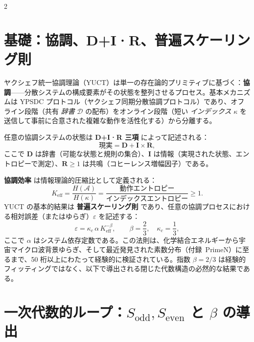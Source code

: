 \documentclass[12pt,a4paper]{article}
\newcommand{\Keff}{K_{\mathrm{eff}}}
\newcommand{\kappac}{\kappa_c}
\begin{document}
	\begin{multicols}{2}
		
		\section{基礎：協調、D+I·R、普遍スケーリング則}
		
		ヤクシェフ統一協調理論（YUCT）は単一の存在論的プリミティブに基づく：\textbf{協調}——分散システムの構成要素がその状態を整列させるプロセス。基本メカニズムは YPSDC プロトコル（ヤクシェフ同期分散協調プロトコル）であり、オフライン段階（共有 \textit{辞書} \(\mathcal{D}\) の配布）をオンライン段階（短い \textit{インデックス} \(\kappa\) を送信して事前に合意された複雑な動作を活性化する）から分離する。
		
		任意の協調システムの状態は \textbf{D+I·R 三項} によって記述される：
		\[
		\text{現実} = \mathbf{D} + \mathbf{I} \times \mathbf{R},
		\]
		ここで \(\mathbf{D}\) は辞書（可能な状態と規則の集合）、\(\mathbf{I}\) は情報（実現された状態、エントロピーで測定）、\(\mathbf{R} \ge 1\) は共鳴（コヒーレンス増幅因子）である。
		
		\textbf{協調効率} は情報理論的圧縮比として定義される：
		\[
		\Keff = \frac{H(\mathcal{A})}{H(\kappa)} = \frac{\text{動作エントロピー}}{\text{インデックスエントロピー}} \ge 1.
		\]
		YUCT の基本的結果は \textbf{普遍スケーリング則} であり、任意の協調プロセスにおける相対誤差（またはゆらぎ）\(\varepsilon\) を記述する：
		\[
		\boxed{\varepsilon = \kappac \, \alpha \, \Keff^{-\beta}, \qquad \beta = \frac{2}{3}, \quad \kappac = \frac{1}{3}},
		\]
		ここで \(\alpha\) はシステム依存定数である。この法則は、化学結合エネルギーから宇宙マイクロ波背景ゆらぎ、そして最近発見された素数分布（付録~PrimeN）に至るまで、50 桁以上にわたって経験的に検証されている。指数 \(\beta = 2/3\) は経験的フィッティングではなく、以下で導出される閉じた代数構造の必然的な結果である。
		
		\section{一次代数的ループ：\(S_{\mathrm{odd}}, S_{\mathrm{even}}\) と \(\beta\) の導出}
		

\end{multicols}
\end{document}
